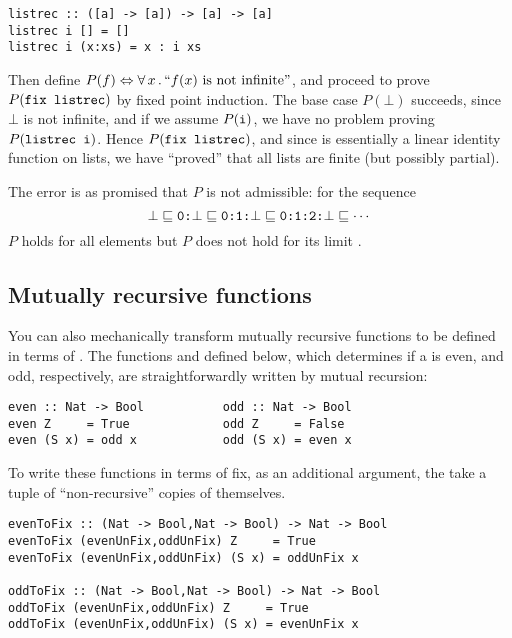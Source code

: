\begin{verbatim}
listrec :: ([a] -> [a]) -> [a] -> [a]
listrec i [] = []
listrec i (x:xs) = x : i xs
\end{verbatim}

Then define
$P(f) \Leftrightarrow \forall \, x \, . \, ``f(x) \,\, \mathrm{is \,\, not \,\, infinite}"$,
and proceed to prove $P(\hs{fix listrec})$ by fixed point induction. The
base case $P(\bot)$ succeeds, since $\bot$ is not infinite, and if we
assume $P(\hs{i})$, we have no problem proving $P(\hs{listrec i})$.
Hence $P(\hs{fix listrec})$, and since  is essentially
a linear identity function on lists, we have ``proved'' that all lists
are finite (but possibly partial).

The error is as promised that $P$ is not admissible: for the sequence
\begin{equation*}
\bot \sqsubseteq
\hs{0:}\bot \sqsubseteq
\hs{0:1:}\bot \sqsubseteq
\hs{0:1:2:}\bot \sqsubseteq
\cdots
\end{equation*}
$P$ holds for all elements but $P$ does not hold for its limit \hs{[0..]}.

\subsection{Mutually recursive functions}

You can also mechanically transform mutually recursive functions to be
defined in terms of . The functions  and 
defined below, which determines if a  is even, and odd,
respectively, are straightforwardly written by mutual recursion:

\begin{verbatim}
even :: Nat -> Bool           odd :: Nat -> Bool
even Z     = True             odd Z     = False
even (S x) = odd x            odd (S x) = even x
\end{verbatim}

To write these functions in terms of fix, as an additional argument,
the take a tuple of ``non-recursive'' copies of themselves.

\begin{verbatim}
evenToFix :: (Nat -> Bool,Nat -> Bool) -> Nat -> Bool
evenToFix (evenUnFix,oddUnFix) Z     = True
evenToFix (evenUnFix,oddUnFix) (S x) = oddUnFix x

oddToFix :: (Nat -> Bool,Nat -> Bool) -> Nat -> Bool
oddToFix (evenUnFix,oddUnFix) Z     = True
oddToFix (evenUnFix,oddUnFix) (S x) = evenUnFix x
\end{verbatim}

